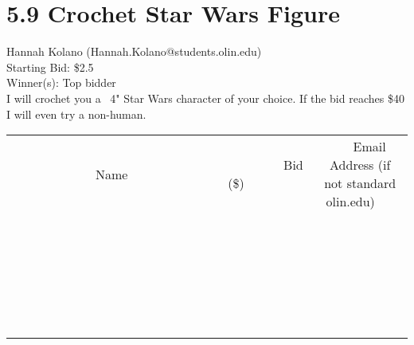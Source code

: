 \documentclass[11pt]{article}
\begin{document}
\section*{5.9 Crochet Star Wars Figure}
Hannah Kolano (Hannah.Kolano@students.olin.edu) \\
Starting Bid: \$2.5 \\
Winner(s): 
Top bidder \\
I will crochet you a ~4" Star Wars character of your choice. If the bid reaches \$40 I will even try a non-human. \\[6ex]
\begin{tabular}{c c c}
~~~~~~~~~~~~~Name~~~~~~~~~~~~~ & ~~~~~~~~~Bid (\$)~~~~~~~~~ & ~~~Email Address (if not standard olin.edu)~~~ \\
 & & \\
\hline
 & & \\
\hline
 & & \\
\hline
 & & \\
\hline
 & & \\
\hline
 & & \\
\hline
 & & \\
\hline
 & & \\
\hline
 & & \\
\hline
 & & \\
\hline
 & & \\
\hline
 & & \\
\hline
 & & \\
\hline
 & & \\
\hline
 & & \\
\hline
 & & \\
\hline
 & & \\
\hline
 & & \\
\hline
 & & \\
\hline
 & & \\
\hline
 & & \\
\hline
 & & \\
\hline
 & & \\
\hline
 & & \\
\hline
 & & \\
\hline
 & & \\
\hline
\end{tabular}
\clearpage
\end{document}
